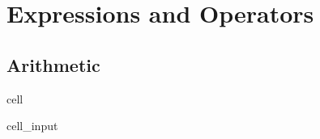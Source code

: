 \documentclass[a4paper,10pt,english]{jupyterBook}
\begin{document}
\sphinxstepscope


\section{Expressions and Operators}
\label{\detokenize{text/progtut/arithmetic:expressions-and-operators}}\label{\detokenize{text/progtut/arithmetic::doc}}

\subsection{Arithmetic}
\label{\detokenize{text/progtut/arithmetic:arithmetic}}
\begin{sphinxuseclass}{cell}\begin{sphinxVerbatimInput}

\begin{sphinxuseclass}{cell_input}
\begin{sphinxVerbatim}[commandchars=\\\{\}]





\end{sphinxVerbatim}
\end{sphinxuseclass}
\end{sphinxVerbatimInput}
\end{sphinxuseclass}
\end{document}
